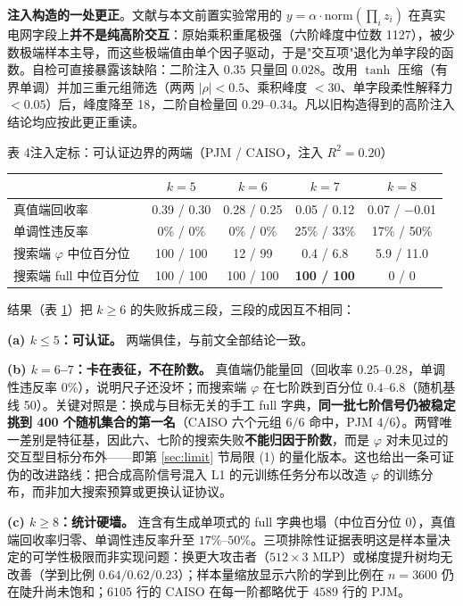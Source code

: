 \documentclass[10.5pt,compsoc,UTF8]{CjC}
\theoremstyle{mystyle}
\newcommand{\Rtwo}{R^{2}}
\begin{document}
\textbf{注入构造的一处更正}。文献与本文前置实验常用的 $y=\alpha\cdot\mathrm{norm}(\prod_i z_i)$ 在真实电网字段上\textbf{并不是纯高阶交互}：原始乘积重尾极强（六阶峰度中位数 1127），被少数极端样本主导，而这些极端值由单个因子驱动，于是"交互项"退化为单字段的函数。自检可直接暴露该缺陷：二阶注入 $0.35$ 只量回 $0.028$。改用 $\tanh$ 压缩（有界单调）并加三重元组筛选（两两 $|\rho|<0.5$、乘积峰度 $<30$、单字段柔性解释力 $<0.05$）后，峰度降至 18，二阶自检量回 $0.29$--$0.34$。凡以旧构造得到的高阶注入结论均应按此更正重读。

\begin{table}[htbp]
\centering
{\heiti 表 4\quad 注入定标：可认证边界的两端（PJM / CAISO，注入 $\Rtwo=0.20$）}
\label{tab:ceiling}
\vspace{2mm}
\begin{tabular}{lcccc}
\toprule
 & $k=5$ & $k=6$ & $k=7$ & $k=8$ \\
\midrule
真值端回收率 & 0.39 / 0.30 & 0.28 / 0.25 & 0.05 / 0.12 & 0.07 / $-$0.01 \\
单调性违反率 & 0\% / 0\% & 0\% / 0\% & 25\% / 33\% & 17\% / 50\% \\
搜索端 $\varphi$ 中位百分位 & 100 / 100 & 12 / 99 & 0.4 / 6.8 & 5.9 / 11.0 \\
搜索端 full 中位百分位 & 100 / 100 & 100 / 100 & \textbf{100 / 100} & 0 / 0 \\
\bottomrule
\end{tabular}
\end{table}

结果（表 \ref{tab:ceiling}）把 $k\ge6$ 的失败拆成三段，三段的成因互不相同：

\textbf{(a) $k\le5$：可认证。} 两端俱佳，与前文全部结论一致。

\textbf{(b) $k=6$--$7$：卡在表征，不在阶数。} 真值端仍能量回（回收率 $0.25$--$0.28$，单调性违反率 $0\%$），说明尺子还没坏；而搜索端 $\varphi$ 在七阶跌到百分位 $0.4$--$6.8$（随机基线 50）。关键对照是：换成与目标无关的手工 full 字典，\textbf{同一批七阶信号仍被稳定挑到 400 个随机集合的第一名}（CAISO 六个元组 $6/6$ 命中，PJM $4/6$）。两臂唯一差别是特征基，因此六、七阶的搜索失败\textbf{不能归因于阶数}，而是 $\varphi$ 对未见过的交互型目标分布外——即第 \ref{sec:limit} 节局限 (1) 的量化版本。这也给出一条可证伪的改进路线：把合成高阶信号混入 L1 的元训练任务分布以改造 $\varphi$ 的训练分布，而非加大搜索预算或更换认证协议。

\textbf{(c) $k\ge8$：统计硬墙。} 连含有生成单项式的 full 字典也塌（中位百分位 0），真值端回收率归零、单调性违反率升至 $17\%$--$50\%$。三项排除性证据表明这是样本量决定的可学性极限而非实现问题：换更大攻击者（$512\times3$ MLP）或梯度提升树均无改善（学到比例 $0.64/0.62/0.23$）；样本量缩放显示六阶的学到比例在 $n=3600$ 仍在陡升尚未饱和；$6105$ 行的 CAISO 在每一阶都略优于 $4589$ 行的 PJM。
\end{document}
